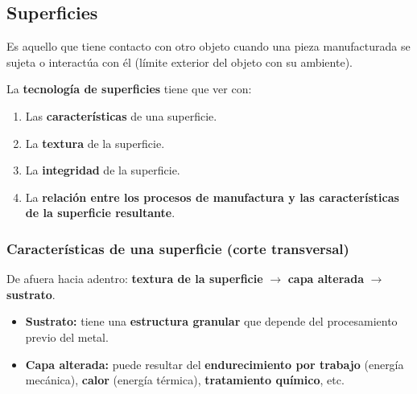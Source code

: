 \documentclass[12pt,a4paper]{article}
\begin{document}
\subsection{Superficies}

\begin{defi}[Superficie]
	Es aquello que tiene contacto con otro objeto cuando una pieza manufacturada
	se sujeta o interactúa con él (límite exterior del objeto con su ambiente).
\end{defi}

La \textbf{tecnología de superficies} tiene que ver con:
\begin{enumerate}
	\item Las \textbf{características} de una superficie.
	\item La \textbf{textura} de la superficie.
	\item La \textbf{integridad} de la superficie.
	\item La \textbf{relación entre los procesos de manufactura y las
		      características de la superficie resultante}.
\end{enumerate}

\subsubsection{Características de una superficie (corte transversal)}
De afuera hacia adentro: \textbf{textura de la superficie} $\rightarrow$
\textbf{capa alterada} $\rightarrow$ \textbf{sustrato}.
\begin{itemize}
	\item \textbf{Sustrato:} tiene una \textbf{estructura granular} que depende
	      del procesamiento previo del metal.
	\item \textbf{Capa alterada:} puede resultar del \textbf{endurecimiento por
		      trabajo} (energía mecánica), \textbf{calor} (energía térmica),
	      \textbf{tratamiento químico}, etc.
\end{itemize}
\end{document}

